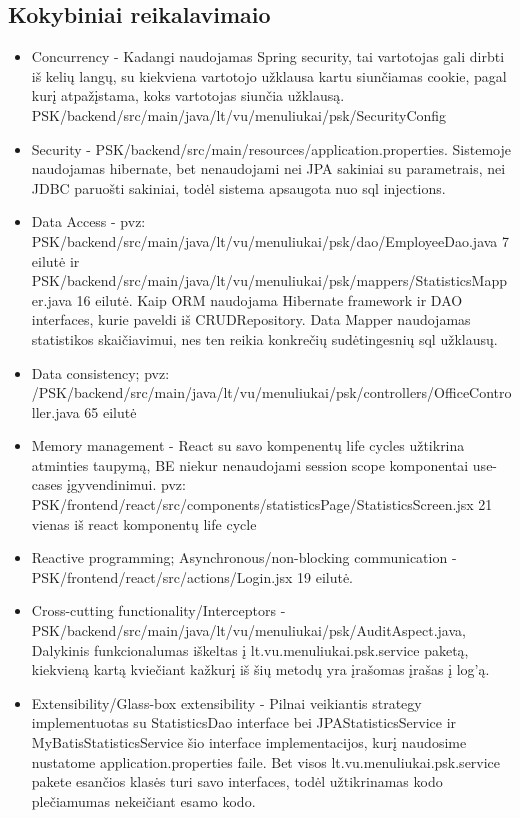 \documentclass{VUMIFInfKursinis}
\begin{document}
\subsection{Kokybiniai reikalavimaio}
\begin{itemize}
	\item{Concurrency -  Kadangi naudojamas Spring security, tai vartotojas gali dirbti iš kelių langų, su kiekviena vartotojo užklausa kartu siunčiamas cookie, pagal kurį atpažįstama, koks vartotojas siunčia užklausą.  PSK/backend/src/main/java/lt/vu/menuliukai/psk/SecurityConfig}
	\item{Security - PSK/backend/src/main/resources/application.properties. Sistemoje naudojamas hibernate, bet nenaudojami nei JPA sakiniai su parametrais, nei JDBC paruošti sakiniai, todėl sistema apsaugota nuo sql injections. }
  \item{Data Access - pvz: PSK/backend/src/main/java/lt/vu/menuliukai/psk/dao/EmployeeDao.java 7 eilutė ir PSK/backend/src/main/java/lt/vu/menuliukai/psk/mappers/StatisticsMapper.java 16 eilutė.
  Kaip ORM naudojama Hibernate framework ir DAO interfaces, kurie paveldi iš CRUDRepository. Data Mapper naudojamas statistikos skaičiavimui, nes ten reikia konkrečių sudėtingesnių sql užklausų.}
  \item{Data consistency;
  pvz: /PSK/backend/src/main/java/lt/vu/menuliukai/psk/controllers/OfficeController.java 65 eilutė}
	\item{Memory management - React su savo kompenentų life cycles užtikrina atminties taupymą, BE niekur nenaudojami session scope komponentai use-cases įgyvendinimui. pvz: PSK/frontend/react/src/components/statisticsPage/StatisticsScreen.jsx 21 vienas iš react komponentų life cycle}
	\item{Reactive programming; Asynchronous/non-blocking communication - PSK/frontend/react/src/actions/Login.jsx 19 eilutė.}
	\item{Cross-cutting functionality/Interceptors - PSK/backend/src/main/java/lt/vu/menuliukai/psk/AuditAspect.java, Dalykinis funkcionalumas iškeltas į lt.vu.menuliukai.psk.service paketą, kiekvieną kartą kviečiant kažkurį iš šių metodų yra įrašomas įrašas į log'ą.}
	\item{Extensibility/Glass-box extensibility - Pilnai veikiantis strategy implementuotas su StatisticsDao interface bei JPAStatisticsService ir MyBatisStatisticsService šio interface implementacijos, kurį naudosime nustatome application.properties faile. Bet visos lt.vu.menuliukai.psk.service pakete esančios klasės turi savo interfaces, todėl užtikrinamas kodo plečiamumas nekeičiant esamo kodo.}
\end{itemize}
\end{document}
